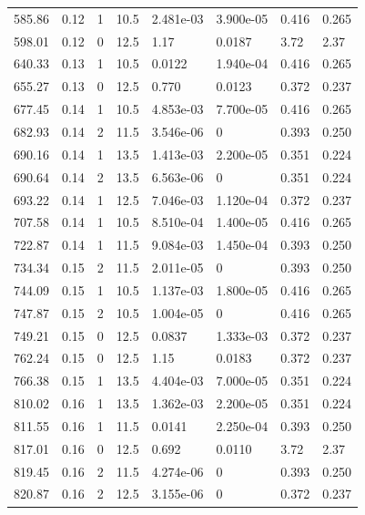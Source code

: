 \documentclass[preview]{standalone}
\begin{document}
{{{\begin{tabular}{L{1.2cm}C{1.2cm} C{0.3cm}C{0.5cm} C{1.4cm}C{1.4cm} C{1.4cm}C{1.4cm}}
  585.86  &  0.12  & 1     & 10.5 &  2.481e-03  & 3.900e-05  & 0.416 &  0.265   \\ 
  598.01  &  0.12  & 0     & 12.5 &  1.17  & 0.0187  & 3.72 &  2.37   \\ 
  640.33  &  0.13  & 1     & 10.5 &  0.0122  & 1.940e-04  & 0.416 &  0.265   \\ 
  655.27  &  0.13  & 0     & 12.5 &  0.770  & 0.0123  & 0.372 &  0.237   \\ 
  677.45  &  0.14  & 1     & 10.5 &  4.853e-03  & 7.700e-05  & 0.416 &  0.265   \\ 
  682.93  &  0.14  & 2     & 11.5 &  3.546e-06  & 0  & 0.393 &  0.250   \\ 
  690.16  &  0.14  & 1     & 13.5 &  1.413e-03  & 2.200e-05  & 0.351 &  0.224   \\ 
  690.64  &  0.14  & 2     & 13.5 &  6.563e-06  & 0  & 0.351 &  0.224   \\ 
  693.22  &  0.14  & 1     & 12.5 &  7.046e-03  & 1.120e-04  & 0.372 &  0.237   \\ 
  707.58  &  0.14  & 1     & 10.5 &  8.510e-04  & 1.400e-05  & 0.416 &  0.265   \\ 
  722.87  &  0.14  & 1     & 11.5 &  9.084e-03  & 1.450e-04  & 0.393 &  0.250   \\ 
  734.34  &  0.15  & 2     & 11.5 &  2.011e-05  & 0  & 0.393 &  0.250   \\ 
  744.09  &  0.15  & 1     & 10.5 &  1.137e-03  & 1.800e-05  & 0.416 &  0.265   \\ 
  747.87  &  0.15  & 2     & 10.5 &  1.004e-05  & 0  & 0.416 &  0.265   \\ 
  749.21  &  0.15  & 0     & 12.5 &  0.0837  & 1.333e-03  & 0.372 &  0.237   \\ 
  762.24  &  0.15  & 0     & 12.5 &  1.15  & 0.0183  & 0.372 &  0.237   \\ 
  766.38  &  0.15  & 1     & 13.5 &  4.404e-03  & 7.000e-05  & 0.351 &  0.224   \\ 
  810.02  &  0.16  & 1     & 13.5 &  1.362e-03  & 2.200e-05  & 0.351 &  0.224   \\ 
  811.55  &  0.16  & 1     & 11.5 &  0.0141  & 2.250e-04  & 0.393 &  0.250   \\ 
  817.01  &  0.16  & 0     & 12.5 &  0.692  & 0.0110  & 3.72 &  2.37   \\ 
  819.45  &  0.16  & 2     & 11.5 &  4.274e-06  & 0  & 0.393 &  0.250   \\ 
  820.87  &  0.16  & 2     & 12.5 &  3.155e-06  & 0  & 0.372 &  0.237   \\ 

\end{tabular}}}}
\end{document}
